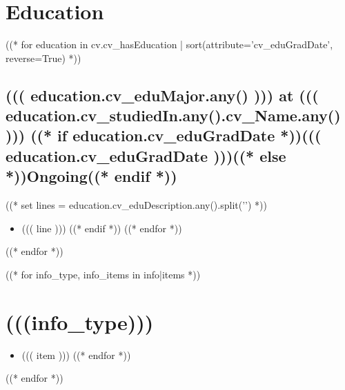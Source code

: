 \documentclass[10pt]{article}
\begin{document}
\section*{Education}
((* for education in cv.cv_hasEducation | sort(attribute='cv_eduGradDate', reverse=True) *))
\subsection*{((( education.cv_eduMajor.any() ))) at ((( education.cv_studiedIn.any().cv_Name.any() ))) \hfill ((* if education.cv_eduGradDate *))((( education.cv_eduGradDate )))((* else *))Ongoing((* endif *))}
((* set lines = education.cv_eduDescription.any().split('\n\n') *))
\begin{itemize}
((* for line in lines *))
((* if line *))
    \item ((( line )))
((* endif *))
((* endfor *))
\end{itemize}
((* endfor *))

((* for info_type, info_items in info|items *))
\section*{(((info_type)))}
\begin{itemize}
((* for item in info_items *))
    \item ((( item )))
((* endfor *))
\end{itemize}
((* endfor *))
\end{document}
